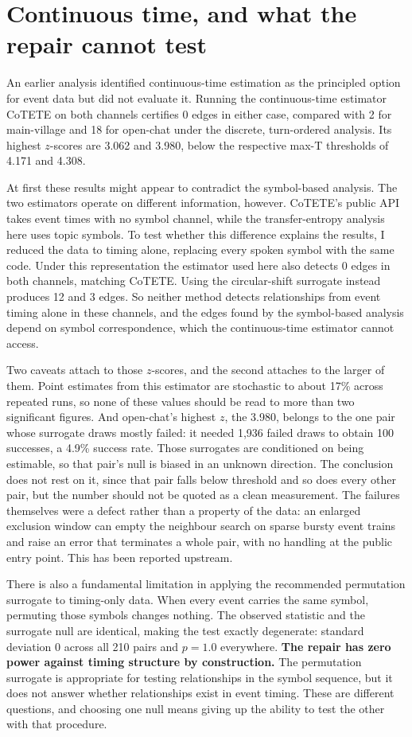 \documentclass[10pt]{article}
\begin{document}
\section{Continuous time, and what the repair cannot test}

An earlier analysis identified continuous-time estimation as the principled option for event data
but did not evaluate it. Running the continuous-time estimator CoTETE on both channels certifies 0
edges in either case, compared with 2 for main-village and 18 for open-chat under the discrete,
turn-ordered analysis. Its highest $z$-scores are 3.062 and 3.980, below the respective max-T
thresholds of 4.171 and 4.308.

At first these results might appear to contradict the symbol-based analysis. The two estimators
operate on different information, however. CoTETE's public API takes event times with no symbol
channel, while the transfer-entropy analysis here uses topic symbols. To test whether this
difference explains the results, I reduced the data to timing alone, replacing every spoken symbol
with the same code. Under this representation the estimator used here also detects 0 edges in both
channels, matching CoTETE. Using the circular-shift surrogate instead produces 12 and 3 edges. So
neither method detects relationships from event timing alone in these channels, and the edges found
by the symbol-based analysis depend on symbol correspondence, which the continuous-time estimator
cannot access.

Two caveats attach to those $z$-scores, and the second attaches to the larger of them. Point
estimates from this estimator are stochastic to about 17\% across repeated runs, so none of these
values should be read to more than two significant figures. And open-chat's highest $z$, the 3.980,
belongs to the one pair whose surrogate draws mostly failed: it needed 1,936 failed draws to obtain
100 successes, a 4.9\% success rate. Those surrogates are conditioned on being estimable, so that
pair's null is biased in an unknown direction. The conclusion does not rest on it, since that pair
falls below threshold and so does every other pair, but the number should not be quoted as a clean
measurement. The failures themselves were a defect rather than a property of the data: an enlarged
exclusion window can empty the neighbour search on sparse bursty event trains and raise an error
that terminates a whole pair, with no handling at the public entry point. This has been reported
upstream.

There is also a fundamental limitation in applying the recommended permutation surrogate to
timing-only data. When every event carries the same symbol, permuting those symbols changes nothing.
The observed statistic and the surrogate null are identical, making the test exactly degenerate:
standard deviation 0 across all 210 pairs and $p = 1.0$ everywhere. \textbf{The repair has zero power
against timing structure by construction.} The permutation surrogate is appropriate for testing
relationships in the symbol sequence, but it does not answer whether relationships exist in event
timing. These are different questions, and choosing one null means giving up the ability to test the
other with that procedure.
\end{document}

